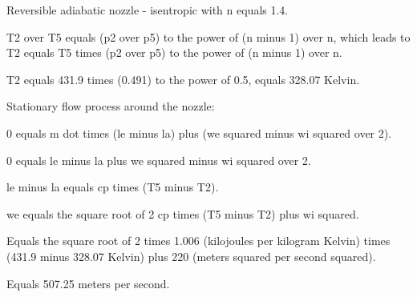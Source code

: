Reversible adiabatic nozzle - isentropic with n equals 1.4.

T2 over T5 equals (p2 over p5) to the power of (n minus 1) over n, which leads to T2 equals T5 times (p2 over p5) to the power of (n minus 1) over n.

T2 equals 431.9 times (0.491) to the power of 0.5, equals 328.07 Kelvin.

Stationary flow process around the nozzle:

0 equals m dot times (le minus la) plus (we squared minus wi squared over 2).

0 equals le minus la plus we squared minus wi squared over 2.

le minus la equals cp times (T5 minus T2).

we equals the square root of 2 cp times (T5 minus T2) plus wi squared.

Equals the square root of 2 times 1.006 (kilojoules per kilogram Kelvin) times (431.9 minus 328.07 Kelvin) plus 220 (meters squared per second squared).

Equals 507.25 meters per second.